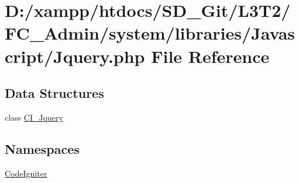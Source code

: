 \hypertarget{_admin_2system_2libraries_2_javascript_2_jquery_8php}{}\section{D\+:/xampp/htdocs/\+S\+D\+\_\+\+Git/\+L3\+T2/\+F\+C\+\_\+\+Admin/system/libraries/\+Javascript/\+Jquery.php File Reference}
\label{_admin_2system_2libraries_2_javascript_2_jquery_8php}
\subsection*{Data Structures}
\begin{DoxyCompactItemize}
\item 
class \hyperlink{class_c_i___jquery}{C\+I\+\_\+\+Jquery}
\end{DoxyCompactItemize}
\subsection*{Namespaces}
\begin{DoxyCompactItemize}
\item 
 \hyperlink{namespace_code_igniter}{Code\+Igniter}
\end{DoxyCompactItemize}
